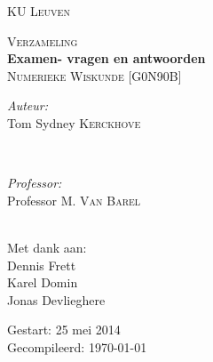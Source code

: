 \begin{titlepage}
\thispagestyle{empty}
\newcommand{\HRule}{\rule{\linewidth}{0.5mm}}
\center
\textsc{\LARGE KU Leuven}\\[1.5cm]
\vfill

\textsc{\large Verzameling}\\[0.5cm]
{ \Huge \bfseries Examen- vragen en antwoorden}\\[0.4cm]
\textsc{\large Numerieke Wiskunde [G0N90B]}\\[0.5cm]
\vfill

\begin{minipage}{0.4\textwidth}
\begin{flushleft} \large
\emph{Auteur:}\\
Tom Sydney \textsc{Kerckhove}
\end{flushleft}
\end{minipage}
~
\begin{minipage}{0.4\textwidth}
\begin{flushright} \large
\emph{Professor:} \\
Professor M. \textsc{Van Barel}\\
\end{flushright}
\end{minipage}\\[4cm]

Met dank aan:\\
{\large Dennis Frett\\Karel Domin\\Jonas Devlieghere\\}
\vfill

{\large Gestart: 25 mei 2014\\ Gecompileerd: \today}\\[3cm]
\vfill 

\end{titlepage}